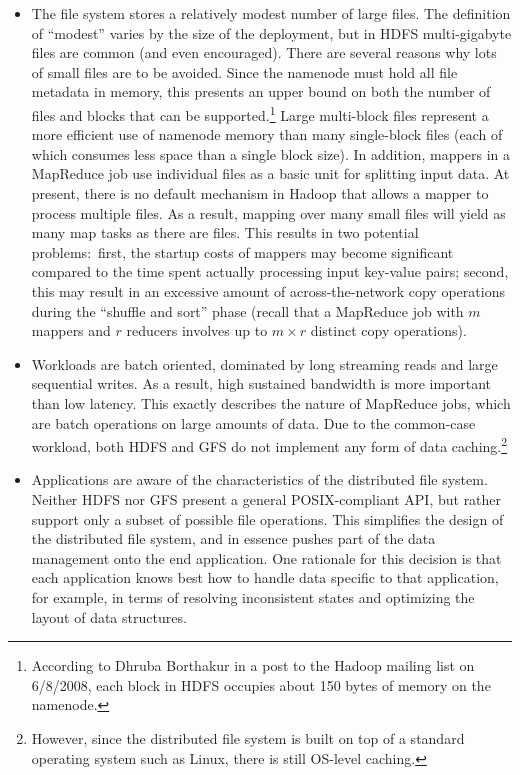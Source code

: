 \begin{itemize}

\item The file system stores a relatively modest number of large
  files.  The definition of ``modest'' varies by the size of the
  deployment, but in HDFS multi-gigabyte files are common (and even
  encouraged).  There are several reasons why lots of small files are
  to be avoided.  Since the namenode must hold all file metadata in
  memory, this presents an upper bound on both the number of files and
  blocks that can be supported.\footnote{According to Dhruba Borthakur
  in a post to the Hadoop mailing list on 6/8/2008, each block in HDFS
  occupies about 150 bytes of memory on the namenode.} Large
  multi-block files represent a more efficient use of namenode memory
  than many single-block files (each of which consumes less space than
  a single block size).  In addition, mappers in a MapReduce job use
  individual files as a basic unit for splitting input data.  At
  present, there is no default mechanism in Hadoop that allows a
  mapper to process multiple files.  As a result, mapping over many
  small files will yield as many map tasks as there are files.  This
  results in two potential problems:\ first, the startup costs of
  mappers may become significant compared to the time spent actually
  processing input key-value pairs; second, this may result in an
  excessive amount of across-the-network copy operations during the
  ``shuffle and sort'' phase (recall that a MapReduce job with $m$
  mappers and $r$ reducers involves up to $m \times r$ distinct copy
  operations).

\item Workloads are batch oriented, dominated by long streaming
  reads and large sequential writes.  As a result, high sustained
  bandwidth is more important than low latency.  This exactly
  describes the nature of MapReduce jobs, which are batch operations
  on large amounts of data.  Due to the common-case workload, both
  HDFS and GFS do not implement any form of data
  caching.\footnote{However, since the distributed file system is
  built on top of a standard operating system such as Linux, there is
  still OS-level caching.}

\item Applications are aware of the characteristics of the distributed
  file system.  Neither HDFS nor GFS present a general POSIX-compliant
  API, but rather support only a subset of possible file operations.
  This simplifies the design of the distributed file system, and in
  essence pushes part of the data management onto the end application.
  One rationale for this decision is that each application knows best
  how to handle data specific to that application, for example, in
  terms of resolving inconsistent states and optimizing the layout of
  data structures.


\end{itemize}
